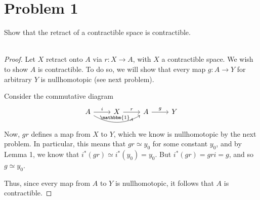 \documentclass[fontsize=11pt]{scrartcl} %
\numberwithin{equation}{section} %
\numberwithin{figure}{section} %
\numberwithin{table}{section} %
\begin{document}
\section*{Problem 1} %
Show that the retract of a contractible space is contractible.
\\
\\
\begin{proof}
    Let $X$ retract onto $A$ via $r:X\to A$, with $X$ a contractible space.
    We wish to show $A$ is contractible. To do so, we will show that every
    map $g:A\to Y$ for arbitrary $Y$ is nullhomotopic (see next problem).

    Consider the commutative diagram
    \[
        \begin{tikzcd}
        A\arrow{r}{i}\arrow[bend right]{rr}{\mathbbm{1}_A} &X\arrow{r}{r}
            &A\arrow{r}{g} &Y
        \end{tikzcd}
    \]
    Now, $gr$ defines a map from $X$ to $Y$, which we know is nullhomotopic by
    the next problem. In particular, this means that $gr\simeq y_0$ for some
    constant $y_0$, and by Lemma 1, we know that $i^*(gr)\simeq i^*(y_0)=y_0$.
    But $i^*(gr)=gri=g$, and so $g\simeq y_0$.

    Thus, since every map from $A$ to $Y$ is nullhomotopic, it follows that $A$
    is contractible.

\end{proof}
\end{document}
